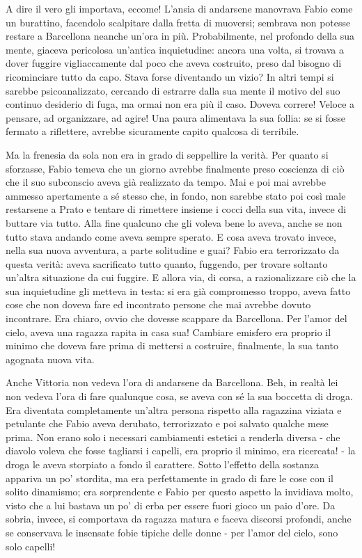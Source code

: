 A dire il vero gli importava, eccome! L'ansia di andarsene manovrava Fabio come un burattino, facendolo scalpitare dalla fretta di muoversi; sembrava non potesse restare a Barcellona neanche un'ora in più. Probabilmente, nel profondo della sua mente, giaceva pericolosa un'antica inquietudine: ancora una volta, si trovava a dover fuggire vigliaccamente dal poco che aveva costruito, preso dal bisogno di ricominciare tutto da capo. Stava forse diventando un vizio? In altri tempi si sarebbe psicoanalizzato, cercando di estrarre dalla sua mente il motivo del suo continuo desiderio di fuga, ma ormai non era più il caso. Doveva correre! Veloce a pensare, ad organizzare, ad agire! Una paura alimentava la sua follia: se si fosse fermato a riflettere, avrebbe sicuramente capito qualcosa di terribile.

Ma la frenesia da sola non era in grado di seppellire la verità. Per quanto si sforzasse, Fabio temeva che un giorno avrebbe finalmente preso coscienza di ciò che il suo subconscio aveva già realizzato da tempo. Mai e poi mai avrebbe ammesso apertamente a sé stesso che, in fondo, non sarebbe stato poi così male restarsene a Prato e tentare di rimettere insieme i cocci della sua vita, invece di buttare via tutto. Alla fine qualcuno che gli voleva bene lo aveva, anche se non tutto stava andando come aveva sempre sperato. E cosa aveva trovato invece, nella sua nuova avventura, a parte solitudine e guai? Fabio era terrorizzato da questa verità: aveva sacrificato tutto quanto, fuggendo, per trovare soltanto un'altra situazione da cui fuggire. E allora via, di corsa, a razionalizzare ciò che la sua inquietudine gli metteva in testa: si era già compromesso troppo, aveva fatto cose che non doveva fare ed incontrato persone che mai avrebbe dovuto incontrare. Era chiaro, ovvio che dovesse scappare da Barcellona. Per l'amor del cielo, aveva una ragazza rapita in casa sua! Cambiare emisfero era proprio il minimo che doveva fare prima di mettersi a costruire, finalmente, la sua tanto agognata nuova vita.

Anche Vittoria non vedeva l'ora di andarsene da Barcellona. Beh, in realtà lei non vedeva l'ora di fare qualunque cosa, se aveva con sé la sua boccetta di droga. Era diventata completamente un'altra persona rispetto alla ragazzina viziata e petulante che Fabio aveva derubato, terrorizzato e poi salvato qualche mese prima. Non erano solo i necessari cambiamenti estetici a renderla diversa - che diavolo voleva che fosse tagliarsi i capelli, era proprio il minimo, era ricercata! - la droga le aveva storpiato a fondo il carattere. Sotto l'effetto della sostanza appariva un po' stordita, ma era perfettamente in grado di fare le cose con il solito dinamismo; era sorprendente e Fabio per questo aspetto la invidiava molto, visto che a lui bastava un po' di erba per essere fuori gioco un paio d'ore. Da sobria, invece, si comportava da ragazza matura e faceva discorsi profondi, anche se conservava le insensate fobie tipiche delle donne - per l'amor del cielo, sono solo capelli!

